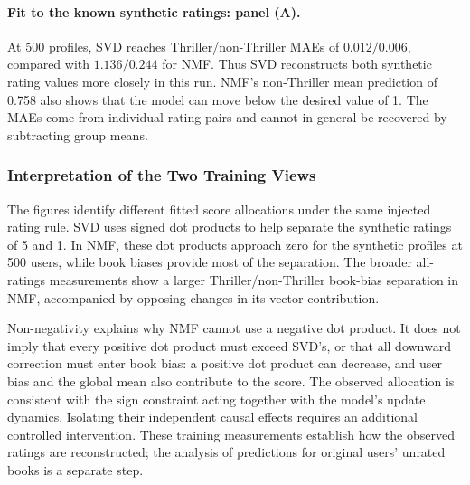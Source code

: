 \documentclass[information,article,submit,pdftex,moreauthors]{Definitions/mdpi}
\newif\ifrevisionnotes
\newcommand{\saracomment}[1]{\ifrevisionnotes\par\smallskip\noindent\textcolor{orange}{\textbf{Sara:} #1}\par\smallskip\fi}
\begin{document}
\paragraph{Fit to the known synthetic ratings: panel (A).}
At 500 profiles, SVD reaches Thriller/non-Thriller MAEs of $0.012/0.006$, compared with $1.136/0.244$ for NMF. Thus SVD reconstructs both synthetic rating values more closely in this run. NMF's non-Thriller mean prediction of 0.758 also shows that the model can move below the desired value of 1. The MAEs come from individual rating pairs and cannot in general be recovered by subtracting group means.

\subsubsection{Interpretation of the Two Training Views}

The figures identify different fitted score allocations under the same injected rating rule. SVD uses signed dot products to help separate the synthetic ratings of 5 and 1. In NMF, these dot products approach zero for the synthetic profiles at 500 users, while book biases provide most of the separation. The broader all-ratings measurements show a larger Thriller/non-Thriller book-bias separation in NMF, accompanied by opposing changes in its vector contribution.

Non-negativity explains why NMF cannot use a negative dot product. It does not imply that every positive dot product must exceed SVD's, or that all downward correction must enter book bias: a positive dot product can decrease, and user bias and the global mean also contribute to the score. The observed allocation is consistent with the sign constraint acting together with the model's update dynamics. Isolating their independent causal effects requires an additional controlled intervention. These training measurements establish how the observed ratings are reconstructed; the analysis of predictions for original users' unrated books is a separate step.

\saracomment{Replaced the earlier parameter discussion with separate explanations of the all-ratings and synthetic-only five-panel figures. Defined rating-pair weighting, raw-score decomposition and MAE; verified baseline and 500-profile values against the source component table. Explained why group averages can differ despite shared fitted parameters. The training views are distinguished from the unread-book prediction analysis that follows.}
\end{document}
